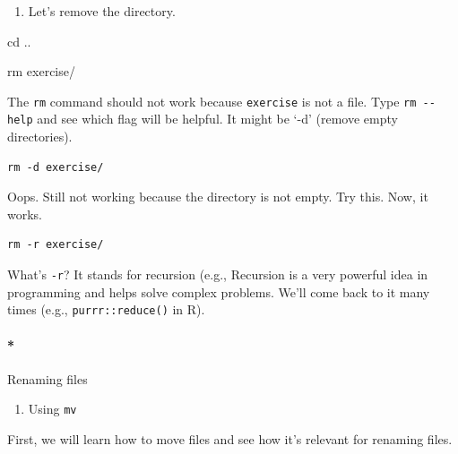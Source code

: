 \documentclass[
  letterpaper,
  DIV=11,
  numbers=noendperiod]{scrreprt}
\let\oldparagraph\paragraph
\renewcommand{\paragraph}[1]{\oldparagraph{#1}\mbox{}}
\newenvironment{Shaded}{\begin{snugshade}}{\end{snugshade}}
\newcommand{\BuiltInTok}[1]{\textcolor[rgb]{0.00,0.23,0.31}{#1}}
\newcommand{\FunctionTok}[1]{\textcolor[rgb]{0.28,0.35,0.67}{#1}}
\newcommand{\NormalTok}[1]{\textcolor[rgb]{0.00,0.23,0.31}{#1}}
\providecommand{\tightlist}{%
  \setlength{\itemsep}{0pt}\setlength{\parskip}{0pt}}\usepackage{longtable,booktabs,array}
\begin{document}
\begin{enumerate}
\def\labelenumi{\arabic{enumi}.}
\setcounter{enumi}{3}
\tightlist
\item
  Let's remove the directory.
\end{enumerate}

\begin{Shaded}
\begin{Highlighting}[]

\BuiltInTok{cd}\NormalTok{ .. }

\FunctionTok{rm}\NormalTok{ exercise/}
\end{Highlighting}
\end{Shaded}

The \texttt{rm} command should not work because \texttt{exercise} is not
a file. Type \texttt{rm\ -\/-help} and see which flag will be helpful.
It might be `-d' (remove empty directories).

\begin{verbatim}
rm -d exercise/  
\end{verbatim}

Oops. Still not working because the directory is not empty. Try this.
Now, it works.

\begin{verbatim}
rm -r exercise/ 
\end{verbatim}

What's \texttt{-r}? It stands for recursion (e.g., Recursion is a very
powerful idea in programming and helps solve complex problems. We'll
come back to it many times (e.g., \texttt{purrr::reduce()} in R).

\hypertarget{renaming-files}{%
\paragraph*{Renaming files}\label{renaming-files}}

\begin{enumerate}
\def\labelenumi{\arabic{enumi}.}
\tightlist
\item
  Using \texttt{mv}
\end{enumerate}

First, we will learn how to move files and see how it's relevant for
renaming files.
\end{document}
